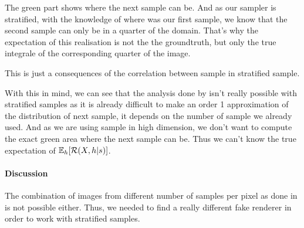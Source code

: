 \documentclass{classeENS}
\begin{document}
\begin{center}
\end{center}
The green part shows where the next sample can be. And as our sampler is stratified,
with the knowledge of where was our first sample, we know that the second sample can only
be in a quarter of the domain. That's why the expectation of this realisation is not the
the groundtruth, but only the true integrale of the corresponding quarter of the image.
\par This is just a consequences of the correlation between sample in stratified sample.

\par With this in mind, we can see that the analysis done by \cite{10.1145/3550454.3555515}
isn't really possible with stratified samples as it is already difficult to make an order 1 approximation of 
the distribution of next sample, it depends on the number of sample we already used. 
And as we are using sample in high dimension, we don't want to compute the exact green 
area where the next sample can be. Thus we can't know the true expectation of $\mathbb E_h[\mathcal R(X,h | s)]$.

\paragraph*{Discussion} The combination of images from different number of samples per pixel 
as done in \cite{kuznetsov2018deep} is not possible either. Thus, we needed to find a really 
different fake renderer in order to work with stratified samples.
\end{document}
